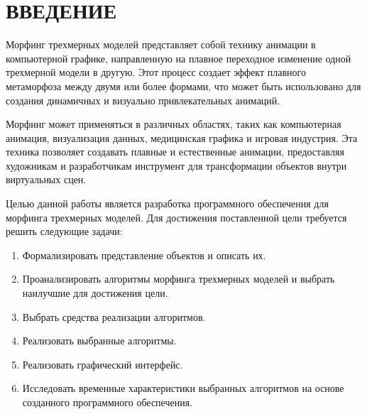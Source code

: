 \chapter*{ВВЕДЕНИЕ}

Морфинг трехмерных моделей представляет собой технику анимации в компьютерной графике, направленную на плавное переходное изменение одной трехмерной модели в другую. 
Этот процесс создает эффект плавного метаморфоза между двумя или более формами, что может быть использовано для создания динамичных и визуально привлекательных анимаций.

Морфинг может применяться в различных областях, таких как компьютерная анимация, визуализация данных, медицинская графика и игровая индустрия. 
Эта техника позволяет создавать плавные и естественные анимации, предоставляя художникам и разработчикам инструмент для трансформации объектов внутри виртуальных сцен.

Целью данной работы является разработка программного обеспечения для морфинга трехмерных моделей. Для достижения поставленной цели требуется решить следующие задачи:
\begin{enumerate}
	\item Формализировать представление объектов и описать их.
	\item Проанализировать алгоритмы морфинга трехмерных моделей и выбрать наилучшие для достижения цели.
	\item Выбрать средства реализации алгоритмов.
	\item Реализовать выбранные алгоритмы.
	\item Реализовать графический интерфейс.
	\item Исследовать временные характеристики выбранных алгоритмов на основе созданного программного обеспечения.
\end{enumerate}
